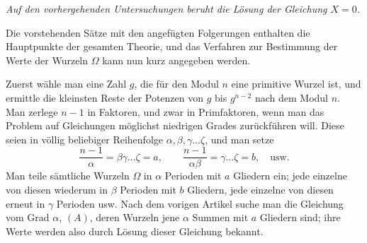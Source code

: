 \begin{center}\textit{Auf den vorhergehenden Untersuchungen beruht die Lösung der Gleichung \(X=0\).}\end{center}


Die vorstehenden Sätze mit den angefügten Folgerungen enthalten die Hauptpunkte der gesamten Theorie, und das Verfahren zur Bestimmung der Werte der Wurzeln \(\Omega\) kann nun kurz angegeben werden.

Zuerst wähle man eine Zahl \(g\), die für den Modul \(n\) eine primitive Wurzel ist, und ermittle die kleinsten Reste der Potenzen von \(g\) bis \(g^{n-2}\) nach dem Modul \(n\). Man zerlege \(n-1\) in Faktoren, und zwar in Primfaktoren, wenn man das Problem auf Gleichungen möglichst niedrigen Grades zurückführen will. Diese seien in völlig beliebiger Reihenfolge \(\alpha,\allowbreak \beta,\allowbreak \gamma\ldots\zeta\), und man setze \[\frac{n-1}{\alpha}=\beta\gamma\ldots\zeta=a,\qquad\frac{n-1}{\alpha\beta}=\gamma\ldots\zeta=b,\quad\text{usw.}\] Man teile sämtliche Wurzeln \(\Omega\) in \(\alpha\) Perioden mit \(a\) Gliedern ein; jede einzelne von diesen wiederum in \(\beta\) Perioden mit \(b\) Gliedern, jede einzelne von diesen erneut in \(\gamma\) Perioden usw. Nach dem vorigen Artikel suche man die Gleichung vom Grad \(\alpha\), \((A)\), deren Wurzeln jene \(\alpha\) Summen mit \(a\) Gliedern sind; ihre Werte werden also durch Lösung dieser Gleichung bekannt.

